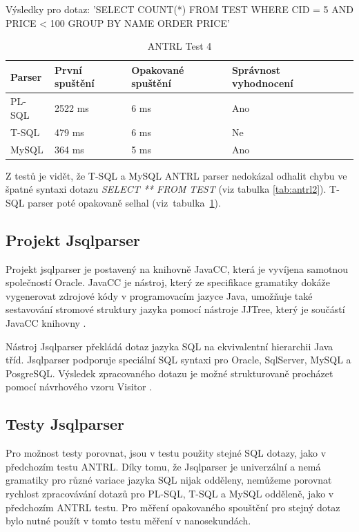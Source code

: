 \documentclass[czech,bachelor,public,dept460,male,cpdeclaration,twoside]{diploma}
\begin{document}
\begin{table}[!htbp]
	\centering
	\caption{ANTRL Test 4}
	Výsledky pro dotaz: 'SELECT COUNT(*) FROM TEST WHERE CID = 5 AND PRICE < 100 GROUP BY NAME ORDER PRICE'
	\vskip 0.1cm
	\label{tab:antrl4}
	\begin{tabular}{lllll}
		\toprule
		Parser & První spuštění & Opakované spuštění & Správnost vyhodnocení\\
		\midrule
		PL-SQL & 2522 ms & 6 ms & Ano \\
        T-SQL & 479 ms & 6 ms & Ne \\
        MySQL & 364 ms & 5 ms & Ano \\
		\midrule
	\end{tabular}
\end{table}


Z testů je vidět, že T-SQL a MySQL ANTRL parser nedokázal odhalit chybu ve špatné syntaxi dotazu \textit{SELECT ** FROM TEST} (viz tabulka \ref{tab:antrl2}). T-SQL parser poté opakovaně selhal (viz~tabulka~\ref{tab:antrl4}).



\subsection{Projekt Jsqlparser}
Projekt jsqlparser je postavený na knihovně JavaCC, která je vyvíjena samotnou společností Oracle. JavaCC je nástroj, který ze specifikace gramatiky dokáže vygenerovat zdrojové kódy v programovacím jazyce Java, umožňuje také sestavování stromové struktury jazyka pomocí nástroje JJTree, který je součástí JavaCC knihovny \cite{jsql}.


Nástroj Jsqlparser překládá dotaz jazyka SQL na ekvivalentní hierarchii Java tříd. Jsqlparser podporuje speciální SQL syntaxi pro Oracle, SqlServer, MySQL a PosgreSQL. Výsledek zpracovaného dotazu je možné strukturovaně procházet pomocí návrhového vzoru Visitor \cite{jsqld}.


\subsection{Testy Jsqlparser}
Pro možnost testy porovnat, jsou v testu použity stejné SQL dotazy, jako v předchozím testu ANTRL. Díky tomu, že Jsqlparser je univerzální a nemá gramatiky pro různé variace jazyka SQL nijak odděleny, nemůžeme porovnat rychlost zpracovávání dotazů pro PL-SQL, T-SQL a MySQL odděleně, jako v předchozím ANTRL testu. Pro měření opakovaného spouštění pro stejný dotaz bylo nutné použít v tomto testu měření v nanosekundách.
\end{document}
